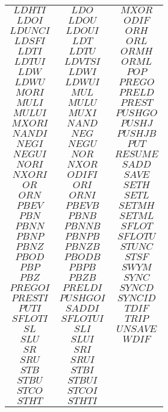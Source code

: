 \documentclass[conference]{IEEEtran}
\begin{document}
\begin{table}
\begin{tabular}{cc|c}
$LDHTI$ & $LDO$ & $MXOR$ \\
$LDOI$ & $LDOU$ & $ODIF$ \\
$LDUNCI$ & $LDOUI$ & $ORH$ \\
$LDSFI$ & $LDT$ & $ORL$ \\
$LDTI$ & $LDTU$ & $ORMH$ \\
$LDTUI$ & $LDVTSI$ & $ORML$ \\
$LDW$ & $LDWI$ & $POP$ \\
$LDWU$ & $LDWUI$ & $PREGO$ \\
$MORI$ & $MUL$ & $PRELD$ \\
$MULI$ & $MULU$ & $PREST$ \\
$MULUI$ & $MUXI$ & $PUSHGO$ \\
$MXORI$ & $NAND$ & $PUSHJ$ \\
$NANDI$ & $NEG$ & $PUSHJB$ \\
$NEGI$ & $NEGU$ & $PUT$ \\
$NEGUI$ & $NOR$ & $RESUME$ \\
$NORI$ & $NXOR$ & $SADD$ \\
$NXORI$ & $ODIFI$ & $SAVE$ \\
$OR$ & $ORI$ & $SETH$ \\
$ORN$ & $ORNI$ & $SETL$ \\
$PBEV$ & $PBEVB$ & $SETMH$ \\
$PBN$ & $PBNB$ & $SETML$ \\
$PBNN$ & $PBNNB$ & $SFLOT$ \\
$PBNP$ & $PBNPB$ & $SFLOTU$ \\
$PBNZ$ & $PBNZB$ & $STUNC$ \\
$PBOD$ & $PBODB$ & $STSF$ \\
$PBP$ & $PBPB$ & $SWYM$ \\
$PBZ$ & $PBZB$ & $SYNC$ \\
$PREGOI$ & $PRELDI$ & $SYNCD$ \\
$PRESTI$ & $PUSHGOI$ & $SYNCID$ \\
$PUTI$ & $SADDI$ & $TDIF$ \\
$SFLOTI$ & $SFLOTUI$ & $TRIP$ \\
$SL$ & $SLI$ & $UNSAVE$ \\
$SLU$ & $SLUI$ & $WDIF$ \\
$SR$ & $SRI$ & \\
$SRU$ & $SRUI$ & \\
$STB$ & $STBI$ & \\
$STBU$ & $STBUI$ & \\
$STCO$ & $STCOI$ & \\
$STHT$ & $STHTI$ & \\

\end{tabular}
\end{table}
\end{document}
